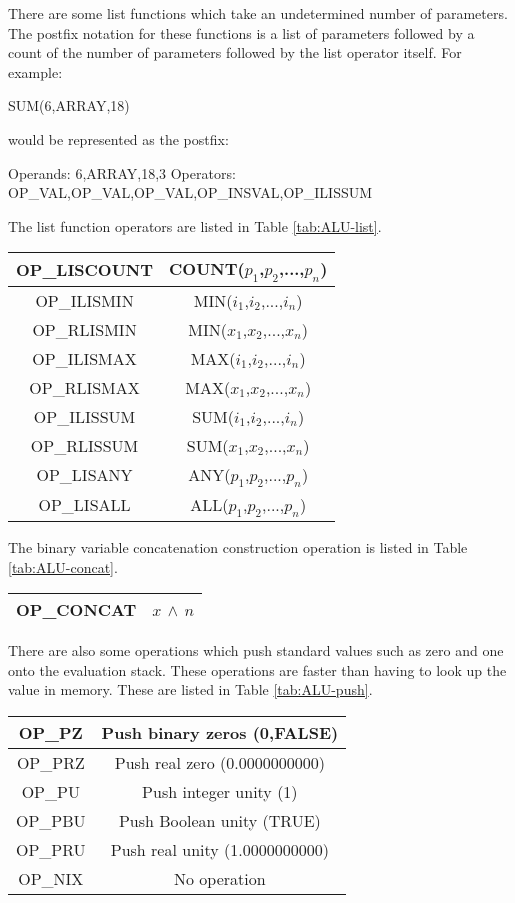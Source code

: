 There are some list functions which take an undetermined number of parameters.
The postfix notation for these functions is a list of parameters followed by
a count of the number of parameters followed by the list operator itself.
For example:
\begin{codeexample}
SUM(6,ARRAY,18)
\end{codeexample}
would be represented as the postfix:
\begin{codeexample}
Operands:  6,ARRAY,18,3
Operators: OP\_VAL,OP\_VAL,OP\_VAL,OP\_INSVAL,OP\_ILISSUM
\end{codeexample}
The list function operators are listed in Table \ref{tab:ALU-list}.

\starttab
\begin{tabular}{|c|c|}
\hline OP\_LISCOUNT & COUNT($p_{1}$,$p_{2}$,...,$p_{n}$) \\
\hline OP\_ILISMIN  & MIN($i_{1}$,$i_{2}$,...,$i_{n}$) \\
\hline OP\_RLISMIN  & MIN($x_{1}$,$x_{2}$,...,$x_{n}$) \\
\hline OP\_ILISMAX  & MAX($i_{1}$,$i_{2}$,...,$i_{n}$) \\
\hline OP\_RLISMAX  & MAX($x_{1}$,$x_{2}$,...,$x_{n}$) \\
\hline OP\_ILISSUM  & SUM($i_{1}$,$i_{2}$,...,$i_{n}$) \\
\hline OP\_RLISSUM  & SUM($x_{1}$,$x_{2}$,...,$x_{n}$) \\
\hline OP\_LISANY   & ANY($p_{1}$,$p_{2}$,...,$p_{n}$) \\
\hline OP\_LISALL   & ALL($p_{1}$,$p_{2}$,...,$p_{n}$) \\
\hline
\end{tabular}

The binary variable concatenation construction operation is listed in
Table \ref{tab:ALU-concat}.

\starttab
\begin{tabular}{|c|c|}
\hline OP\_CONCAT   & $x$ $\wedge$ $n$ \\
\hline
\end{tabular}

There are also some operations which push standard values such as zero
and one onto the evaluation stack.  These operations are faster than having
to look up the value in memory.   These are listed in Table \ref{tab:ALU-push}.

\starttab
\begin{tabular}{|c|c|}
\hline OP\_PZ       & Push binary zeros (0,FALSE) \\
\hline OP\_PRZ      & Push real zero (0.0000000000) \\
\hline OP\_PU       & Push integer unity (1) \\
\hline OP\_PBU      & Push Boolean unity (TRUE) \\
\hline OP\_PRU      & Push real unity (1.0000000000) \\
\hline OP\_NIX      & No operation \\
\hline
\end{tabular}

